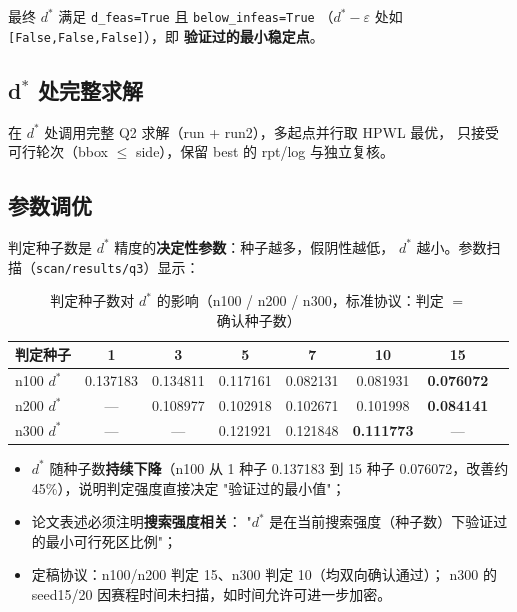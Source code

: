 \documentclass[12pt,a4paper]{article}
\begin{document}
最终 $d^*$ 满足 \texttt{d\_feas=True} 且 \texttt{below\_infeas=True}
（$d^*-\varepsilon$ 处如 \texttt{[False,\allowbreak False,\allowbreak False]}），即
\textbf{验证过的最小稳定点}。

\subsection{d$^*$ 处完整求解}

在 $d^*$ 处调用完整 Q2 求解（run + run2），多起点并行取 HPWL 最优，
只接受可行轮次（bbox $\le$ side），保留 best 的 rpt/log 与独立复核。

\subsection{参数调优}
\label{sec:q3seed}

判定种子数是 $d^*$ 精度的\textbf{决定性参数}：种子越多，假阴性越低，
$d^*$ 越小。参数扫描（\texttt{scan/results/q3}）显示：

\begin{table}[H]
\centering
\small
\caption{判定种子数对 $d^*$ 的影响（n100 / n200 / n300，标准协议：判定 $=$ 确认种子数）}
\begin{tabular}{lccccccc}
\toprule
判定种子 & 1 & 3 & 5 & 7 & 10 & 15 \\
\midrule
n100 $d^*$ & 0.137183 & 0.134811 & 0.117161 & 0.082131 & 0.081931 & \textbf{0.076072} \\
n200 $d^*$ & --- & 0.108977 & 0.102918 & 0.102671 & 0.101998 & \textbf{0.084141} \\
n300 $d^*$ & --- & --- & 0.121921 & 0.121848 & \textbf{0.111773} & --- \\
\bottomrule
\end{tabular}
\end{table}

\begin{itemize}
    \item $d^*$ 随种子数\textbf{持续下降}（n100 从 1 种子 0.137183 到
    15 种子 0.076072，改善约 45\%），说明判定强度直接决定
    "验证过的最小值"；
    \item 论文表述必须注明\textbf{搜索强度相关}：
    "$d^*$ 是在当前搜索强度（种子数）下验证过的最小可行死区比例"；
    \item 定稿协议：n100/n200 判定 15、n300 判定 10（均双向确认通过）；
    n300 的 seed15/20 因赛程时间未扫描，如时间允许可进一步加密。
\end{itemize}
\end{document}
